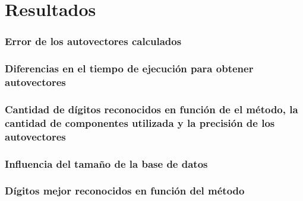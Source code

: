 \section{Resultados}

	\subsubsection{Error de los autovectores calculados}
		
	\subsubsection{Diferencias en el tiempo de ejecuci\'on para obtener autovectores}
		

	\subsubsection{Cantidad de d\'igitos reconocidos en funci\'on de el m\'etodo,
	la cantidad de componentes utilizada y la precisi\'on de los autovectores}
		


	\subsubsection{Influencia del tama\~no de la base de datos}

	\subsubsection{D\'igitos mejor reconocidos en funci\'on del m\'etodo}
